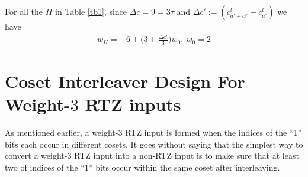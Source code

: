 \documentclass[11pt, oneside, dvipdfmx]{book}
\begin{document}
For all the $\Pi$ in Table \ref{tb1}, since $\Delta c = 9=3\tau$ and $\Delta c':=(c_{a'+\alpha'}^{t'}-c_{a'}^{t'})$  we have
\begin{equation}
\begin{split}
w_H=&6+\Big(3+\frac{\Delta c'}{3}\Big)w_0,~w_0=2
\end{split}
\end{equation}








\section{Coset Interleaver Design For Weight-$3$ RTZ inputs}
As mentioned earlier, a weight-$3$ RTZ input is formed when the indices of the ``1'' bits each occur in different cosets.  It goes without saying that the simplest way to convert a weight-$3$ RTZ input into a non-RTZ input is to make sure that at least two of indices of the ``1'' bits occur within the same coset after interleaving.
\end{document}
